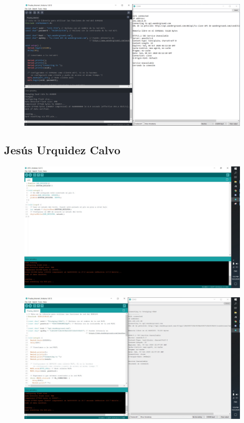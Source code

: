 \documentclass[12pt]{article}
\begin{document}
\begin{figure}[!h]
\centering
\includegraphics[width = \textwidth]{axel2}
\end{figure}

\newpage

\subsection{Jesús Urquidez Calvo}
\begin{figure}[!h]
\centering
\includegraphics[width = \textwidth]{gsus1}
\end{figure}

\begin{figure}[!h]
\centering
\includegraphics[width = \textwidth]{gsus2}
\end{figure}
\end{document}
